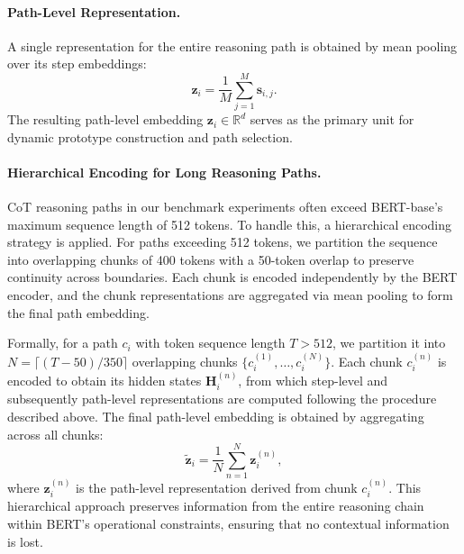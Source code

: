 \documentclass[a4paper,fleqn]{cas-dc}
\begin{document}
\paragraph{Path-Level Representation.}
A single representation for the entire reasoning path is obtained by mean pooling over its step embeddings:
\[
\mathbf{z}_i = \frac{1}{M} \sum_{j=1}^{M} \mathbf{s}_{i,j}.
\]
The resulting path-level embedding $\mathbf{z}_i \in \mathbb{R}^d$ serves as the primary unit for dynamic prototype construction and path selection.

\paragraph{Hierarchical Encoding for Long Reasoning Paths.}
CoT reasoning paths in our benchmark experiments often exceed BERT-base's maximum sequence length of 512 tokens. To handle this, a hierarchical encoding strategy is applied. For paths exceeding 512 tokens, we partition the sequence into overlapping chunks of 400 tokens with a 50-token overlap to preserve continuity across boundaries. Each chunk is encoded independently by the BERT encoder, and the chunk representations are aggregated via mean pooling to form the final path embedding.

Formally, for a path $c_i$ with token sequence length $T > 512$, we partition it into $N = \lceil (T - 50) / 350 \rceil$ overlapping chunks $\{c_i^{(1)}, \ldots, c_i^{(N)}\}$. Each chunk $c_i^{(n)}$ is encoded to obtain its hidden states $\mathbf{H}_i^{(n)}$, from which step-level and subsequently path-level representations are computed following the procedure described above. The final path-level embedding is obtained by aggregating across all chunks:
\[
\tilde{\mathbf{z}}_i = \frac{1}{N} \sum_{n=1}^{N} \mathbf{z}_i^{(n)},
\]
where $\mathbf{z}_i^{(n)}$ is the path-level representation derived from chunk $c_i^{(n)}$. This hierarchical approach preserves information from the entire reasoning chain within BERT's operational constraints, ensuring that no contextual information is lost.
\end{document}
